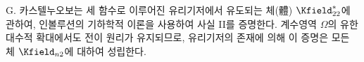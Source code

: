 
G. 카스텔누오보는 세 함수로 이루어진 유리기저에서 유도되는 체(體) $\Kfield^*_{22}$에 관하여, 인볼루션의 기하학적 이론을 사용하여 사실 II를 증명한다. 계수영역 $\Omega$의 유한 대수적 확대에서도 전이 원리가 유지되므로, 유리기저의 존재에 의해 이 증명은 모든 체 $\Kfield_{n2}$에 대하여 성립한다.
